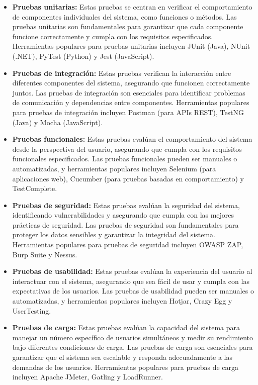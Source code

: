 \begin{itemize}
    \item \textbf{Pruebas unitarias:} Estas pruebas se centran en verificar el comportamiento de componentes individuales del sistema, como funciones o métodos. Las pruebas unitarias son fundamentales para garantizar que cada componente funcione correctamente y cumpla con los requisitos especificados. Herramientas populares para pruebas unitarias incluyen JUnit (Java), NUnit (.NET), PyTest (Python) y Jest (JavaScript).
    \item \textbf{Pruebas de integración:} Estas pruebas verifican la interacción entre diferentes componentes del sistema, asegurando que funcionen correctamente juntos. Las pruebas de integración son esenciales para identificar problemas de comunicación y dependencias entre componentes. Herramientas populares para pruebas de integración incluyen Postman (para APIs REST), TestNG (Java) y Mocha (JavaScript).
    \item \textbf{Pruebas funcionales:} Estas pruebas evalúan el comportamiento del sistema desde la perspectiva del usuario, asegurando que cumpla con los requisitos funcionales especificados. Las pruebas funcionales pueden ser manuales o automatizadas, y herramientas populares incluyen Selenium (para aplicaciones web), Cucumber (para pruebas basadas en comportamiento) y TestComplete.
    \item \textbf{Pruebas de seguridad:} Estas pruebas evalúan la seguridad del sistema, identificando vulnerabilidades y asegurando que cumpla con las mejores prácticas de seguridad. Las pruebas de seguridad son fundamentales para proteger los datos sensibles y garantizar la integridad del sistema. Herramientas populares para pruebas de seguridad incluyen OWASP ZAP, Burp Suite y Nessus.
    \item \textbf{Pruebas de usabilidad:} Estas pruebas evalúan la experiencia del usuario al interactuar con el sistema, asegurando que sea fácil de usar y cumpla con las expectativas de los usuarios. Las pruebas de usabilidad pueden ser manuales o automatizadas, y herramientas populares incluyen Hotjar, Crazy Egg y UserTesting.
    \item \textbf{Pruebas de carga:} Estas pruebas evalúan la capacidad del sistema para manejar un número específico de usuarios simultáneos y medir su rendimiento bajo diferentes condiciones de carga. Las pruebas de carga son esenciales para garantizar que el sistema sea escalable y responda adecuadamente a las demandas de los usuarios. Herramientas populares para pruebas de carga incluyen Apache JMeter, Gatling y LoadRunner.
\end{itemize}